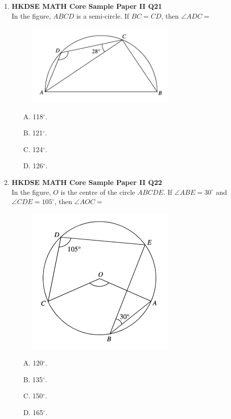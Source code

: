 \documentclass[12pt]{article}
\begin{document}
\begin{enumerate}
	\item \textbf{HKDSE MATH Core Sample Paper II Q21}\\
	In the figure, $ABCD$ is a semi-circle. If $BC = CD$, then $\angle ADC = $
	\begin{figure}[H]
		\centering
		\includegraphics[width = 0.7\textwidth]{SPFigure2.21.png}	
	\end{figure}
	\begin{enumerate}
		\item[A.] 118$^\circ$.
		\item[B.] 121$^\circ$.
		\item[C.] 124$^\circ$.
		\item[D.] 126$^\circ$.
	\end{enumerate}

	\item \textbf{HKDSE MATH Core Sample Paper II Q22}\\
	In the figure, $O$ is the centre of the circle $ABCDE$. If $\angle ABE = 30^\circ$ and $\angle CDE = 105^\circ$, then $\angle AOC = $
	\begin{figure}[H]
		\centering
		\includegraphics[width = 0.7\textwidth]{SPFigure2.22.png}	
	\end{figure}
	\begin{enumerate}
		\item[A.] 120$^\circ$.
		\item[B.] 135$^\circ$.
		\item[C.] 150$^\circ$.
		\item[D.] 165$^\circ$.
	\end{enumerate}
	

\end{enumerate}
\end{document}
